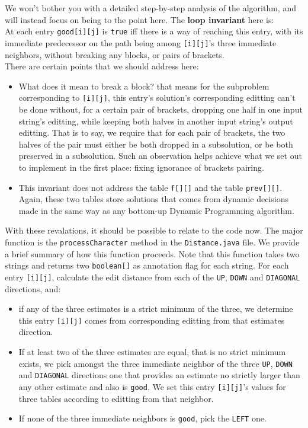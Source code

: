 \documentclass{article}
\begin{document}
We won't bother you with a detailed step-by-step analysis of the algorithm, and will instead focus on being to the point here. The \textbf{loop invariant} here is:\\

At each entry \texttt{good[i][j]} is \texttt{true} iff there is a way of reaching this entry, with its immediate predecessor on the path being among \texttt{[i][j]}'s three immediate neighbors, without breaking any blocks, or pairs of brackets.\\

There are certain points that we should address here:
\begin{itemize}
  \item What does it mean to break a block? that means for the subproblem corresponding to \texttt{[i][j]}, this entry's solution's corresponding editting can't be done without, for a certain pair of brackets, dropping one half in one input string's editting, while keeping both halves in another input string's output editting. That is to say, we require that for each pair of brackets, the two halves of the pair must either be both dropped in a subsolution, or be both preserved in a subsolution. Such an observation helps achieve what we set out to implement in the first place: fixing ignorance of brackets pairing.
  \item This invariant does not address the table \texttt{f[][]} and the table \texttt{prev[][]}. Again, these two tables store solutions that comes from dynamic decisions made in the same way as any bottom-up Dynamic Programming algorithm. 
\end{itemize}
With these revalations, it should be possible to relate to the code now. The major function is the \texttt{processCharacter} method in the \texttt{Distance.java} file. We provide a brief summary of how this function proceeds. Note that this function takes two strings and returns two \texttt{boolean[]} as annotation flag for each string. For each entry \texttt{[i][j]}, calculate the edit distance from each of the \texttt{UP}, \texttt{DOWN} and \texttt{DIAGONAL} directions, and:
\begin{itemize}
  \item if any of the three estimates is a strict minimum of the three, we determine this entry \texttt{[i][j]} comes from corresponding editting from that estimates direction.
  \item If at least two of the three estimates are equal, that is no strict minimum exists, we pick amongst the three immediate neighbor of the three \texttt{UP}, \texttt{DOWN} and \texttt{DIAGONAL} directions one that provides an estimate no strictly larger than any other estimate and also is \texttt{good}. We set this entry \texttt{[i][j]}'s values for three tables according to editting from that neighbor. 
  \item If none of the three immediate neighbors is \texttt{good}, pick the \texttt{LEFT} one. 
\end{itemize}
\end{document}
